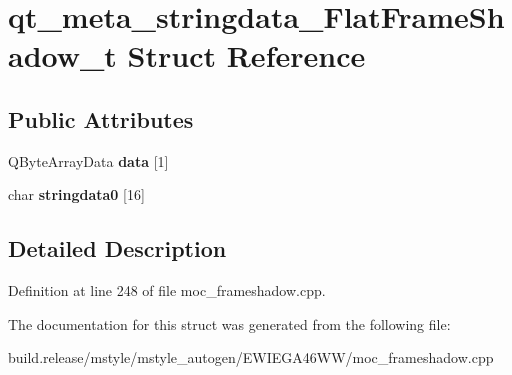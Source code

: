 \hypertarget{structqt__meta__stringdata___flat_frame_shadow__t}{}\section{qt\+\_\+meta\+\_\+stringdata\+\_\+\+Flat\+Frame\+Shadow\+\_\+t Struct Reference}
\label{structqt__meta__stringdata___flat_frame_shadow__t}
\subsection*{Public Attributes}
\begin{DoxyCompactItemize}
\item 
\mbox{\label{structqt__meta__stringdata___flat_frame_shadow__t_afaee98f1798cece36665233fc6d22a93}} 
Q\+Byte\+Array\+Data {\bfseries data} \mbox{[}1\mbox{]}
\item 
\mbox{\label{structqt__meta__stringdata___flat_frame_shadow__t_aa62d1cb3103ab78cca9820a746139409}} 
char {\bfseries stringdata0} \mbox{[}16\mbox{]}
\end{DoxyCompactItemize}


\subsection{Detailed Description}


Definition at line 248 of file moc\+\_\+frameshadow.\+cpp.



The documentation for this struct was generated from the following file\+:\begin{DoxyCompactItemize}
\item 
build.\+release/mstyle/mstyle\+\_\+autogen/\+E\+W\+I\+E\+G\+A46\+W\+W/moc\+\_\+frameshadow.\+cpp\end{DoxyCompactItemize}
